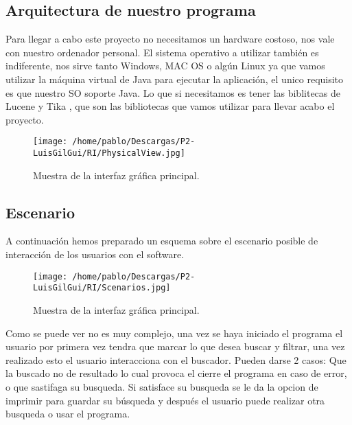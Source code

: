 \subsection{Arquitectura de nuestro programa}

Para llegar a cabo este proyecto no necesitamos un hardware costoso, nos vale con nuestro ordenador personal. El sistema operativo a utilizar también es indiferente, nos sirve tanto Windows, MAC OS o algún Linux ya que vamos utilizar la máquina virtual de Java para ejecutar la aplicación, el unico requisito es que nuestro SO soporte Java. Lo que si necesitamos es tener las biblitecas de Lucene y Tika , que son las bibliotecas que vamos utilizar para llevar acabo el proyecto.

\begin{figure}[H] %
\centering
\texttt{[image: /home/pablo/Descargas/P2-LuisGilGui/RI/PhysicalView.jpg]}  %
\caption{Muestra de la interfaz gráfica principal.}\label{figura1}
\end{figure}
\subsection{Escenario}

A continuación hemos preparado un esquema sobre el escenario posible de interacción de los usuarios con el software.

\begin{figure}[H] %
\centering
\texttt{[image: /home/pablo/Descargas/P2-LuisGilGui/RI/Scenarios.jpg]}  %
\caption{Muestra de la interfaz gráfica principal.}\label{figura1}
\end{figure}

Como se puede ver no es muy complejo, una vez se haya iniciado el programa el usuario por primera vez tendra que marcar lo que desea buscar y filtrar, una vez realizado esto el usuario interacciona con el buscador. Pueden darse 2 casos: Que la buscado no de resultado lo cual provoca el cierre el programa en caso de error, o que sastifaga su busqueda. Si satisface su busqueda se le da la opcion de imprimir para guardar su búsqueda y después el usuario puede realizar otra busqueda o usar el programa.
